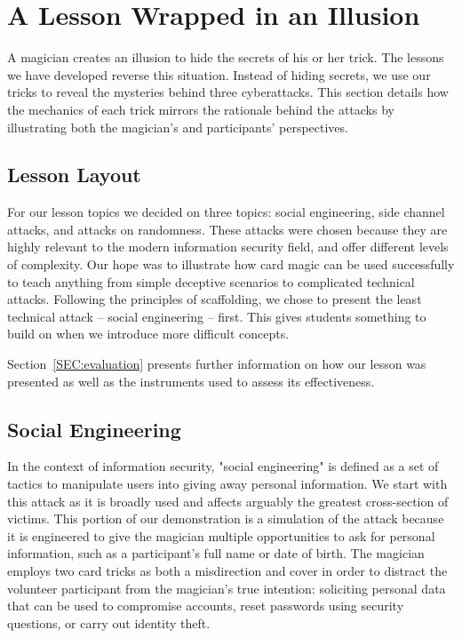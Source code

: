 \section{A Lesson Wrapped in an Illusion}
\label{SEC:background}


A magician creates an illusion to hide the secrets of his or her trick.
The lessons we have developed reverse this situation.
Instead of hiding secrets, we use our tricks to reveal
the mysteries behind
three cyberattacks.
This section details how the mechanics of each trick mirrors the
rationale behind the attacks by illustrating both the magician's and
participants' perspectives.


\subsection{Lesson Layout}

For our lesson topics we decided on three topics: social engineering, side
channel attacks, and attacks on randomness.
These attacks were chosen
because they
are highly relevant to the modern information security field,
and offer different levels of complexity.
Our hope was to illustrate how card magic can be used
successfully to teach anything from simple deceptive scenarios to complicated
technical attacks.
Following the principles of scaffolding,
we chose to present the least technical attack -- social engineering --
first.  This gives students something to build on when we introduce more
difficult concepts.

Section~\ref{SEC:evaluation} presents further information on how our lesson
was presented as well as the instruments used to assess its effectiveness.

\subsection{Social Engineering}

In the context of information security,
"social engineering" is defined as a set
of tactics to manipulate users into giving away personal information.
We start with this attack as it is broadly used and affects arguably the
greatest cross-section of victims.  This portion of our demonstration
is a simulation of the attack because it is engineered to give
the magician multiple opportunities to ask for personal information,
such as a participant's full name or date of birth.
The magician employs two card tricks
as
both a misdirection and cover
in order to
distract the
volunteer participant from
the magician's true intention: soliciting
personal data that
can be used to compromise accounts,
reset passwords using security questions, or
carry out identity theft.

